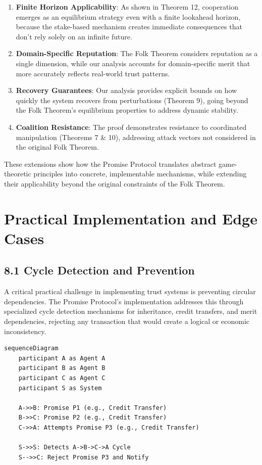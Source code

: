\documentclass[11pt]{article}
\begin{document}
\begin{enumerate}
\item \textbf{Finite Horizon Applicability}: As shown in Theorem 12, cooperation emerges as an equilibrium strategy even with a finite lookahead horizon, because the stake-based mechanism creates immediate consequences that don't rely solely on an infinite future.

\item \textbf{Domain-Specific Reputation}: The Folk Theorem considers reputation as a single dimension, while our analysis accounts for domain-specific merit that more accurately reflects real-world trust patterns.

\item \textbf{Recovery Guarantees}: Our analysis provides explicit bounds on how quickly the system recovers from perturbations (Theorem 9), going beyond the Folk Theorem's equilibrium properties to address dynamic stability.

\item \textbf{Coalition Resistance}: The proof demonstrates resistance to coordinated manipulation (Theorems 7 \& 10), addressing attack vectors not considered in the original Folk Theorem.
\end{enumerate}

These extensions show how the Promise Protocol translates abstract game-theoretic principles into concrete, implementable mechanisms, while extending their applicability beyond the original constraints of the Folk Theorem.
\section{Practical Implementation and Edge Cases}
\label{sec:org81cb128}
\subsection{8.1 Cycle Detection and Prevention}
\label{sec:org0b6deca}
A critical practical challenge in implementing trust systems is preventing circular dependencies. The Promise Protocol's implementation addresses this through specialized cycle detection mechanisms for inheritance, credit transfers, and merit dependencies, rejecting any transaction that would create a logical or economic inconsistency.

\begin{verbatim}
sequenceDiagram
    participant A as Agent A
    participant B as Agent B
    participant C as Agent C
    participant S as System

    A->>B: Promise P1 (e.g., Credit Transfer)
    B->>C: Promise P2 (e.g., Credit Transfer)
    C->>A: Attempts Promise P3 (e.g., Credit Transfer)

    S->>S: Detects A->B->C->A Cycle
    S-->>C: Reject Promise P3 and Notify
\end{verbatim}
\end{document}

